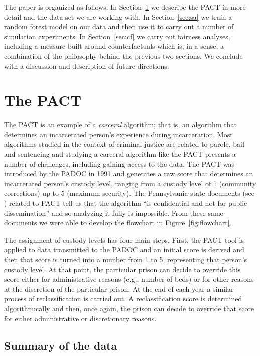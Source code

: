 \documentclass{amsproc}
\numberwithin{equation}{section}
\theoremstyle{plain}
\theoremstyle{remark}
\begin{document}
The paper is organized as follows.  In Section~\ref{sec:pact} we describe the PACT in more detail and the data set we are working with.  In Section~\ref{sec:sa} we train a random forest model on our data and then use it to carry out a number of simulation experiments.  In Section~\ref{sec:cf} we carry out fairness analyses, including a measure built around counterfactuals which is, in a sense, a combination of the philosophy behind the previous two sections.  We conclude with a discussion and description of future directions.

\section{The PACT}\label{sec:pact}

The PACT is an example of a \emph{carceral} algorithm; that is, an algorithm that determines an incarcerated person's experience during incarceration.  Most algorithms studied in the context of criminal justice are related to parole, bail and sentencing and studying a carceral algorithm like the PACT presents a number of challenges, including gaining access to the data.  The PACT was introduced by the PADOC in 1991 and generates a raw score that determines an incarcerated person's custody level, ranging from a custody level of 1 (community corrections) up to 5 (maximum security).  The Pennsylvania state documents (see \cite{PACT}) related to PACT tell us that the algorithm ``is confidential and not for public dissemination'' and so analyzing it fully is impossible.  From these same documents we were able to develop the flowchart in Figure~\ref{fig:flowchart}.  

The assignment of custody levels has four main steps.  First, the PACT tool is applied to data transmitted to the PADOC and an initial score is derived and then that score is turned into a number from 1 to 5, representing that person's custody level.  At that point, the particular prison can decide to override this score either for administrative reasons (e.g., number of beds) or for other reasons at the discretion of the particular prison.  At the end of each year a similar process of reclassification is carried out.  A reclassification score is determined algorithmically and then, once again, the prison can decide to override that score for either administrative or discretionary reasons.  

\subsection{Summary of the data}
\end{document}
